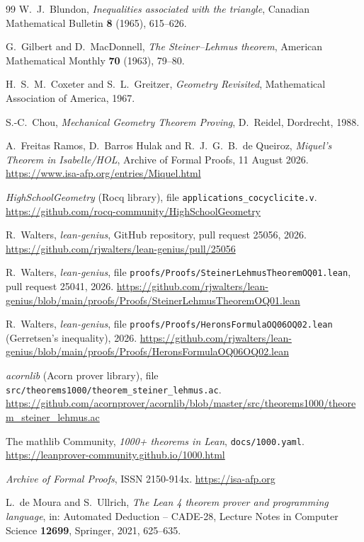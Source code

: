 \documentclass[11pt]{article}
\theoremstyle{definition}
\theoremstyle{remark}
\begin{document}
\begin{thebibliography}{99}
W.~J.~Blundon,
\emph{Inequalities associated with the triangle},
Canadian Mathematical Bulletin \textbf{8} (1965), 615--626.

G.~Gilbert and D.~MacDonnell,
\emph{The Steiner--Lehmus theorem},
American Mathematical Monthly \textbf{70} (1963), 79--80.

H.~S.~M.~Coxeter and S.~L.~Greitzer,
\emph{Geometry Revisited},
Mathematical Association of America, 1967.

S.-C.~Chou,
\emph{Mechanical Geometry Theorem Proving},
D.~Reidel, Dordrecht, 1988.

A.~Freitas Ramos, D.~Barros Hulak and R.~J.~G.~B.~de Queiroz,
\emph{Miquel's Theorem in Isabelle/HOL}, Archive of Formal Proofs, 11 August 2026.
\url{https://www.isa-afp.org/entries/Miquel.html}

\emph{HighSchoolGeometry} (Rocq library), file \texttt{applications\_cocyclicite.v}.
\url{https://github.com/rocq-community/HighSchoolGeometry}

R.~Walters,
\emph{lean-genius}, GitHub repository, pull request 25056, 2026.
\url{https://github.com/rjwalters/lean-genius/pull/25056}

R.~Walters,
\emph{lean-genius}, file \texttt{proofs/Proofs/SteinerLehmusTheoremOQ01.lean}, pull request 25041, 2026.
\url{https://github.com/rjwalters/lean-genius/blob/main/proofs/Proofs/SteinerLehmusTheoremOQ01.lean}

R.~Walters,
\emph{lean-genius}, file \texttt{proofs/Proofs/HeronsFormulaOQ06OQ02.lean} (Gerretsen's inequality), 2026.
\url{https://github.com/rjwalters/lean-genius/blob/main/proofs/Proofs/HeronsFormulaOQ06OQ02.lean}

\emph{acornlib} (Acorn prover library), file \texttt{src/theorems1000/theorem\_steiner\_lehmus.ac}.
\url{https://github.com/acornprover/acornlib/blob/master/src/theorems1000/theorem_steiner_lehmus.ac}

The mathlib Community, \emph{1000+ theorems in Lean}, \texttt{docs/1000.yaml}.
\url{https://leanprover-community.github.io/1000.html}

\emph{Archive of Formal Proofs}, ISSN 2150-914x. \url{https://isa-afp.org}

L.~de Moura and S.~Ullrich,
\emph{The Lean 4 theorem prover and programming language},
in: Automated Deduction -- CADE-28, Lecture Notes in Computer Science \textbf{12699}, Springer, 2021, 625--635.


\end{thebibliography}
\end{document}
